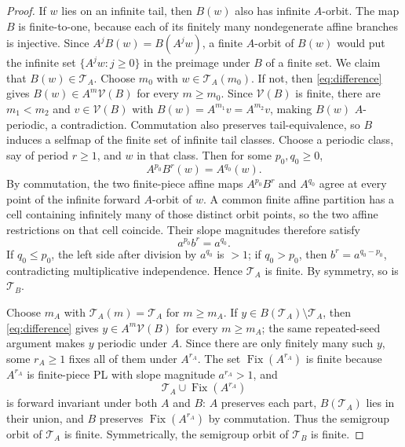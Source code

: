 \documentclass[11pt]{article}
\newcommand{\Fix}{\operatorname{Fix}}
\begin{document}
\begin{proof}
If $w$ lies on an infinite tail, then $B(w)$ also has infinite $A$-orbit. The map $B$ is finite-to-one,
because each of its finitely many nondegenerate affine branches is injective. Since
$A^jB(w)=B(A^j w)$, a finite $A$-orbit of $B(w)$ would put the infinite set
$\{A^j w:j\ge0\}$ in the preimage under $B$ of a finite set. We claim that
$B(w)\in\mathcal T_A$. Choose $m_0$ with $w\in\mathcal T_A(m_0)$. If not, then
\eqref{eq:difference} gives
$B(w)\in A^m\mathcal V(B)$ for every $m\ge m_0$. Since $\mathcal V(B)$ is finite, there are
$m_1<m_2$ and $v\in\mathcal V(B)$ with
$B(w)=A^{m_1}v=A^{m_2}v$, making $B(w)$ $A$-periodic, a contradiction. Commutation also preserves
tail-equivalence, so $B$ induces a selfmap of the finite set of infinite tail classes. Choose a periodic
class, say of period $r\ge1$, and $w$ in that class. Then for some $p_0,q_0\ge0$,
\begin{equation}\label{eq:tail-relation}
A^{p_0}B^r(w)=A^{q_0}(w).
\end{equation}
By commutation, the two finite-piece affine maps $A^{p_0}B^r$ and $A^{q_0}$ agree at every point of the
infinite forward $A$-orbit of $w$. A common finite affine partition has a cell containing infinitely many
of those distinct orbit points, so the two affine restrictions on that cell coincide. Their slope magnitudes
therefore satisfy
\[
a^{p_0}b^r=a^{q_0}.
\]
If $q_0\le p_0$, the left side after division by $a^{q_0}$ is $>1$; if $q_0>p_0$, then
$b^r=a^{q_0-p_0}$, contradicting multiplicative independence. Hence $\mathcal T_A$ is finite. By
symmetry, so is $\mathcal T_B$.

Choose $m_A$ with $\mathcal T_A(m)=\mathcal T_A$ for $m\ge m_A$. If
$y\in B(\mathcal T_A)\setminus\mathcal T_A$, then \eqref{eq:difference} gives
$y\in A^m\mathcal V(B)$ for every $m\ge m_A$; the same repeated-seed argument makes $y$ periodic
under $A$. Since there are only finitely many such $y$, some $r_A\ge1$ fixes all of them under
$A^{r_A}$. The set $\Fix(A^{r_A})$ is finite because $A^{r_A}$ is finite-piece PL with slope magnitude
$a^{r_A}>1$, and
\[
\mathcal T_A\cup\Fix(A^{r_A})
\]
is forward invariant under both $A$ and $B$: $A$ preserves each part, $B(\mathcal T_A)$ lies in their
union, and $B$ preserves $\Fix(A^{r_A})$ by commutation. Thus the semigroup orbit of $\mathcal T_A$
is finite. Symmetrically, the semigroup orbit of $\mathcal T_B$ is finite.


\end{proof}
\end{document}
